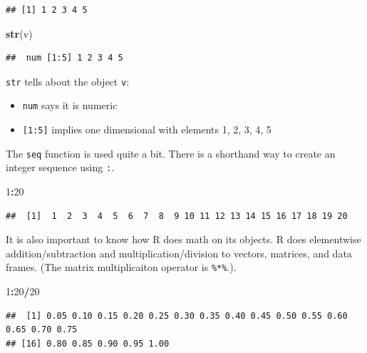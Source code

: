 \documentclass[
]{book}
\newenvironment{Shaded}{\begin{snugshade}}{\end{snugshade}}
\newcommand{\DecValTok}[1]{\textcolor[rgb]{0.00,0.00,0.81}{#1}}
\newcommand{\KeywordTok}[1]{\textcolor[rgb]{0.13,0.29,0.53}{\textbf{#1}}}
\newcommand{\NormalTok}[1]{#1}
\newcommand{\OperatorTok}[1]{\textcolor[rgb]{0.81,0.36,0.00}{\textbf{#1}}}
\theoremstyle{definition}
\theoremstyle{definition}
\theoremstyle{definition}
\theoremstyle{remark}
\begin{document}
\begin{verbatim}
## [1] 1 2 3 4 5
\end{verbatim}

\begin{Shaded}
\begin{Highlighting}[]
\KeywordTok{str}\NormalTok{(v)}
\end{Highlighting}
\end{Shaded}

\begin{verbatim}
##  num [1:5] 1 2 3 4 5
\end{verbatim}

\texttt{str} tells about the object \texttt{v}:

\begin{itemize}
\item
  \texttt{num} says it is numeric
\item
  \texttt{{[}1:5{]}} implies one dimensional with elements 1, 2, 3, 4, 5
\end{itemize}

The \texttt{seq} function is used quite a bit. There is a shorthand way to create an integer sequence using \texttt{:}.

\begin{Shaded}
\begin{Highlighting}[]
\DecValTok{1}\OperatorTok{:}\DecValTok{20} 
\end{Highlighting}
\end{Shaded}

\begin{verbatim}
##  [1]  1  2  3  4  5  6  7  8  9 10 11 12 13 14 15 16 17 18 19 20
\end{verbatim}

It is also important to know how R does math on its objects. R does elementwise addition/subtraction and multiplication/division to vectors, matrices, and data frames. (The matrix multiplicaiton operator is \texttt{\%*\%}.).

\begin{Shaded}
\begin{Highlighting}[]
\DecValTok{1}\OperatorTok{:}\DecValTok{20}\OperatorTok{/}\DecValTok{20}
\end{Highlighting}
\end{Shaded}

\begin{verbatim}
##  [1] 0.05 0.10 0.15 0.20 0.25 0.30 0.35 0.40 0.45 0.50 0.55 0.60 0.65 0.70 0.75
## [16] 0.80 0.85 0.90 0.95 1.00
\end{verbatim}
\end{document}
